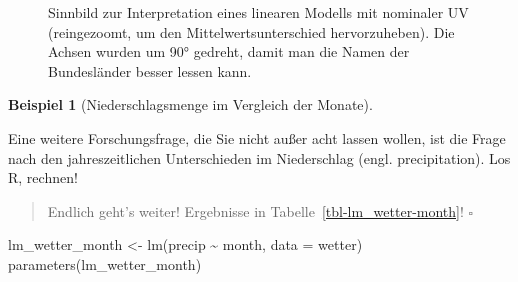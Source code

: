 \documentclass[
  a4paper,
]{scrbook}
\newenvironment{Shaded}{\begin{snugshade}}{\end{snugshade}}
\newcommand{\AttributeTok}[1]{\textcolor[rgb]{0.40,0.45,0.13}{#1}}
\newcommand{\FunctionTok}[1]{\textcolor[rgb]{0.28,0.35,0.67}{#1}}
\newcommand{\NormalTok}[1]{\textcolor[rgb]{0.00,0.23,0.31}{#1}}
\newcommand{\OtherTok}[1]{\textcolor[rgb]{0.00,0.23,0.31}{#1}}
\newcommand{\SpecialCharTok}[1]{\textcolor[rgb]{0.37,0.37,0.37}{#1}}
\theoremstyle{definition}
\newtheorem{example}{Beispiel}[chapter]
\theoremstyle{definition}
\theoremstyle{definition}
\theoremstyle{remark}
\begin{document}
\begin{figure}


\caption{\label{fig-bin-nom}Sinnbild zur Interpretation eines linearen
Modells mit nominaler UV (reingezoomt, um den Mittelwertsunterschied
hervorzuheben). Die Achsen wurden um 90° gedreht, damit man die Namen
der Bundesländer besser lessen kann.}

\end{figure}%

\begin{example}[Niederschlagsmenge im Vergleich der
Monate]\protect\hypertarget{exm-months}{}\label{exm-months}

Eine weitere Forschungsfrage, die Sie nicht außer acht lassen wollen,
ist die Frage nach den jahreszeitlichen Unterschieden im Niederschlag
(engl. precipitation). Los R, rechnen!

\begin{quote}
{} Endlich geht's weiter! Ergebnisse in
Tabelle~\ref{tbl-lm_wetter-month}! \(\square\)
\end{quote}

\end{example}

\begin{Shaded}
\begin{Highlighting}[]
\NormalTok{lm\_wetter\_month }\OtherTok{\textless{}{-}} \FunctionTok{lm}\NormalTok{(precip }\SpecialCharTok{\textasciitilde{}}\NormalTok{ month, }\AttributeTok{data =}\NormalTok{ wetter)}
\FunctionTok{parameters}\NormalTok{(lm\_wetter\_month)}
\end{Highlighting}
\end{Shaded}
\end{document}
